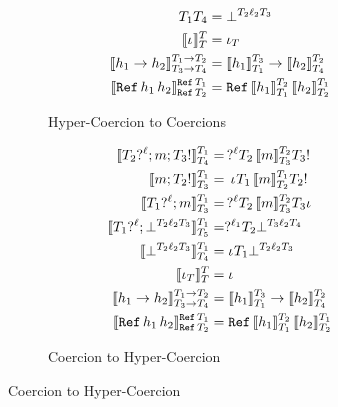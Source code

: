 \documentclass[acmtog, authorversion, acmlarge]{acmart}
\begin{document}
\begin{figure}[tbh]
\begin{subfigure}{.5\textwidth}
\begin{align*}
             {\T_1}{\T_4}
             &=
      \failed{\T_2}{\Lbl_2}{\T_3}
      \\
      \interp{\id}{\T}{\T} &= \id[\T]
      \\
      \interp{\fn{\HC_1}{\HC_2}}
             {\Fn{\T_1}{\T_2}}{\Fn{\T_3}{\T_4}}
             &=
      \fn{\interp{\HC_1}{\T_3}{\T_1}}
         {\interp{\HC_2}{\T_2}{\T_4}}
      \\
      \interp{\rf{\HC_1}{\HC_2}}
             {\Ref{\T_1}}{\Ref{\T_2}}
             &=
      \rf{\interp{\HC_1}{\T_2}{\T_1}}
         {\interp{\HC_2}{\T_1}{\T_2}}
    \end{align*}
    \caption{Hyper-Coercion to Coercions}
    \label{fig:h2c}
  \end{subfigure}%
    \begin{subfigure}{.5\textwidth}
      \begin{align*}
        \interp{\Seq{\prj[\T_2]{\Lbl}}
                    {\Seq{\Int}{\inj[\T_3]}}}
               {\T_1} {\T_4}
        &=
               \hc{\prj{\Lbl}}{\T_2}
                  {\interp{\Int}{\T_2}{\T_3}}
                  {\T_3}{\inj}
      \\
      \interp{\Seq{\Int}{\inj[\T_2]}}{\T_1}{\T_3}
      &=
      \hc{\pmt}{\T_1}
         {\interp{\Int}{\T_1}{\T_2}}
         {\T_2}{\inj}
      \\
      \interp{\Seq{\prj[\T_1]{\Lbl}}{\Int}}
             {\T_1}{\T_3}
      &=
       \hc{\prj{\Lbl}}{\T_2}
          {\interp{\Int}{\T_2}{\T_3}}
         {\T_3}{\imt} 
      \\
      \interp{\Seq{\prj[\T_1]{\Lbl}}
                  {\failed{\T_2}{\Lbl_2}{\T_3}}}
             {\T_1}{\T_5}
      &=
      \hcfail{\prj{\Lbl_1}}{\T_2}{\T_3}{\Lbl_2}{\T_4}
      \\
      \interp{\failed{\T_2}{\Lbl_2}{\T_3}}
             {\T_1}{\T_4}
             &=
             \hcfail{\pmt}{\T_1}{\T_2}{\Lbl_2}{\T_3}
      \\
      \interp{\id[\T]}{\T}{\T} &= \id
      \\
      \interp{\fn{\HC_1}{\HC_2}}
             {\Fn{\T_1}{\T_2}}{\Fn{\T_3}{\T_4}}
             &=
      \fn{\interp{\HC_1}{\T_3}{\T_1}}
         {\interp{\HC_2}{\T_2}{\T_4}}
      \\
      \interp{\rf{\HC_1}{\HC_2}}
             {\Ref{\T_1}}{\Ref{\T_2}}
             &=
      \rf{\interp{\HC_1}{\T_2}{\T_1}}
         {\interp{\HC_2}{\T_1}{\T_2}}
    \end{align*}
    \caption{Coercion to Hyper-Coercion}
    \label{fig:c2h}
  \end{subfigure}
\end{figure}
\end{document}
